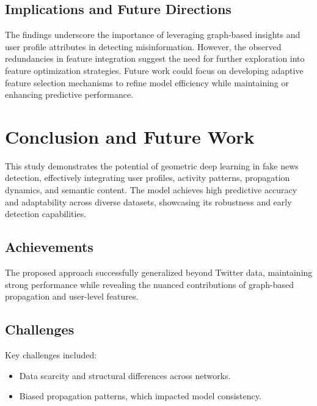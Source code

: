 \documentclass[sigconf,nonacm]{acmart}
\begin{document}
\subsection{Implications and Future Directions}

The findings underscore the importance of leveraging graph-based insights and user profile attributes in detecting misinformation. However, the observed redundancies in feature integration suggest the need for further exploration into feature optimization strategies. Future work could focus on developing adaptive feature selection mechanisms to refine model efficiency while maintaining or enhancing predictive performance.


\section{Conclusion and Future Work}

This study demonstrates the potential of geometric deep learning in fake news detection, effectively integrating user profiles, activity patterns, propagation dynamics, and semantic content. The model achieves high predictive accuracy and adaptability across diverse datasets, showcasing its robustness and early detection capabilities.

\subsection*{Achievements}
The proposed approach successfully generalized beyond Twitter data, maintaining strong performance while revealing the nuanced contributions of graph-based propagation and user-level features.

\subsection*{Challenges}
Key challenges included:
\begin{itemize}
    \item Data scarcity and structural differences across networks.
    \item Biased propagation patterns, which impacted model consistency.
\end{itemize}
\end{document}
